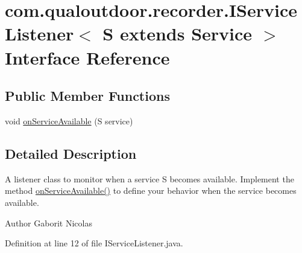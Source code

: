 \hypertarget{interfacecom_1_1qualoutdoor_1_1recorder_1_1IServiceListener_3_01S_01extends_01Service_01_4}{\section{com.\-qualoutdoor.\-recorder.\-I\-Service\-Listener$<$ S extends Service $>$ Interface Reference}
\label{interfacecom_1_1qualoutdoor_1_1recorder_1_1IServiceListener_3_01S_01extends_01Service_01_4}
}
\subsection*{Public Member Functions}
\begin{DoxyCompactItemize}
\item 
void \hyperlink{interfacecom_1_1qualoutdoor_1_1recorder_1_1IServiceListener_3_01S_01extends_01Service_01_4_a8ae86c5db9afafc83bf51b1cfb4e1ea9}{on\-Service\-Available} (S service)
\end{DoxyCompactItemize}


\subsection{Detailed Description}
A listener class to monitor when a service S becomes available. Implement the method {\ttfamily \hyperlink{interfacecom_1_1qualoutdoor_1_1recorder_1_1IServiceListener_3_01S_01extends_01Service_01_4_a8ae86c5db9afafc83bf51b1cfb4e1ea9}{on\-Service\-Available()}} to define your behavior when the service becomes available.

\begin{DoxyAuthor}{Author}
Gaborit Nicolas 
\end{DoxyAuthor}


Definition at line 12 of file I\-Service\-Listener.\-java.



